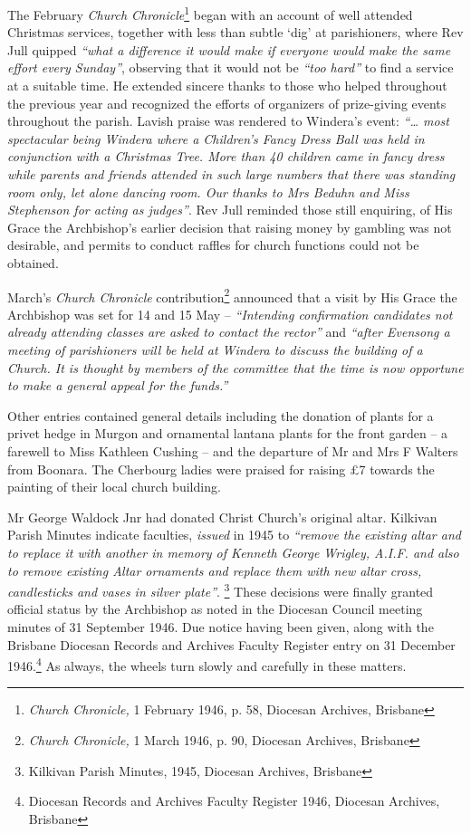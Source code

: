 The February \emph{Church Chronicle}\footnote{\emph{Church Chronicle,} 1 February 1946, p. 58, Diocesan Archives, Brisbane} began with an account of well attended Christmas services, together with less than subtle `dig' at parishioners, where Rev Jull quipped \emph{``what a difference it would make if everyone would make the same effort every Sunday''}, observing that it would not be \emph{``too hard''} to find a service at a suitable time. He extended sincere thanks to those who helped throughout the previous year and recognized the efforts of organizers of prize-giving events throughout the parish. Lavish praise was rendered to Windera's event: \emph{``\ldots{} most spectacular being Windera where a Children's Fancy Dress Ball was held in conjunction with a Christmas Tree. More than 40 children came in fancy dress while parents and friends attended in such large numbers that there was standing room only, let alone dancing room. Our thanks to Mrs Beduhn and Miss Stephenson for acting as judges''}. Rev Jull reminded those still enquiring, of His Grace the Archbishop's earlier decision that raising money by gambling was not desirable, and permits to conduct raffles for church functions could not be obtained.


March's \emph{Church Chronicle} contribution\footnote{\emph{Church Chronicle,} 1 March 1946, p. 90, Diocesan Archives, Brisbane} announced that a visit by His Grace the Archbishop was set for 14 and 15 May -- \emph{``Intending confirmation candidates not already attending classes are asked to contact the rector''} and \emph{``after Evensong a meeting of parishioners will be held at Windera to discuss the building of a Church. It is thought by members of the committee that the time is now opportune to make a general appeal for the funds.''}


Other entries contained general details including the donation of plants for a privet hedge in Murgon and ornamental lantana plants for the front garden -- a farewell to Miss Kathleen Cushing -- and the departure of Mr and Mrs F Walters from Boonara. The Cherbourg ladies were praised for raising \pounds7 towards the painting of their local church building.



Mr George Waldock Jnr had donated Christ Church's original altar. Kilkivan Parish Minutes indicate faculties, \emph{issued} in 1945 to \emph{``remove the existing altar and to replace it with another in memory of Kenneth George Wrigley, A.I.F. and also to remove existing Altar ornaments and replace them with new altar cross, candlesticks and vases in silver plate''}. \footnote{Kilkivan Parish Minutes, 1945, Diocesan Archives, Brisbane} These decisions were finally granted official status by the Archbishop as noted in the Diocesan Council meeting minutes of 31 September 1946. Due notice having been given, along with the Brisbane Diocesan Records and Archives Faculty Register entry on 31 December 1946.\footnote{Diocesan Records and Archives Faculty Register 1946, Diocesan Archives, Brisbane} As always, the wheels turn slowly and carefully in these matters.


